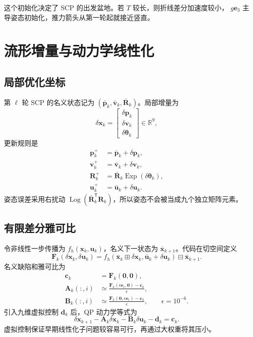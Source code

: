 \documentclass[UTF8,a4paper,11pt]{ctexart}
\newcommand{\R}{\mathbb R}
\newcommand{\Exp}{\operatorname{Exp}}
\newcommand{\Log}{\operatorname{Log}}
\begin{document}
这个初始化决定了 SCP 的出发盆地。若 $T$ 较长，则折线差分加速度较小，
$g\bm e_3$ 主导姿态初始化，推力箭头从第一轮起就接近竖直。

\section{流形增量与动力学线性化}

\subsection{局部优化坐标}

第 $\ell$ 轮 SCP 的名义状态记为
$(\bar{\bm p}_k,\bar{\bm v}_k,\bar{\bm R}_k)$。局部增量为
\begin{equation}
 \delta\bm x_k=
 \begin{bmatrix}
 \delta\bm p_k\\ \delta\bm v_k\\ \delta\bm\theta_k
 \end{bmatrix}\in\R^9,
\end{equation}
更新规则是
\begin{align}
 \bm p_k^+&=\bar{\bm p}_k+\delta\bm p_k,\\
 \bm v_k^+&=\bar{\bm v}_k+\delta\bm v_k,\\
 \bm R_k^+&=\bar{\bm R}_k\Exp(\delta\bm\theta_k),\\
 \bm u_k^+&=\bar{\bm u}_k+\delta\bm u_k.
 \label{eq:scp-update}
\end{align}
姿态误差采用右扰动
$\Log(\bar{\bm R}_k^\mathsf T\bm R_k)$，所以姿态不会被当成九个独立矩阵元素。

\subsection{有限差分雅可比}

令非线性一步传播为 $f_h(\bm x_k,\bm u_k)$，名义下一状态为
$\bar{\bm x}_{k+1}$。代码在切空间定义
\begin{equation}
 \bm F_k(\delta\bm x_k,\delta\bm u_k)
 =f_h(\bar{\bm x}_k\boxplus\delta\bm x_k,
 \bar{\bm u}_k+\delta\bm u_k)\boxminus\bar{\bm x}_{k+1}.
\end{equation}
名义缺陷和雅可比为
\begin{align}
 \bm c_k&=\bm F_k(\bm0,\bm0),\\
 \bm A_k(:,i)&\simeq
 \frac{\bm F_k(\epsilon\bm e_i,\bm0)-\bm c_k}{\epsilon},\\
 \bm B_k(:,i)&\simeq
 \frac{\bm F_k(\bm0,\epsilon\bm e_i)-\bm c_k}{\epsilon},
 \qquad \epsilon=10^{-6}.
\end{align}
引入九维虚拟控制 $\bm d_k$ 后，QP 动力学等式为
\begin{equation}
 \delta\bm x_{k+1}-\bm A_k\delta\bm x_k
 -\bm B_k\delta\bm u_k-\bm d_k=\bm c_k.
 \label{eq:linear-dynamics}
\end{equation}
虚拟控制保证早期线性化子问题较容易可行，再通过大权重将其压小。
\end{document}
